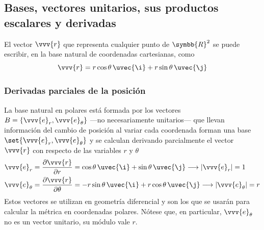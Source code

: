 \subsection{Bases, vectores unitarios, sus productos escalares y derivadas}
El vector $\vvv{r}$ que representa cualquier punto de $\symbb{R}^2$ se puede escribir, en
la base natural de coordenadas cartesianas, como
\begin{equation}
  \vvv{r} = r\cos\theta\,\uvec{\i} + r\sin\theta\,\uvec{\j}
\end{equation}
\subsubsection{Derivadas parciales de la posición}
La base natural en polares está formada por los vectores
$B = \{\vvv{e}_r, \vvv{e}_{\theta}\}$ ---no necesariamente unitarios--- que llevan
información del cambio de posición al variar cada coordenada forman una base
$\set{\vvv{e}_r, \vvv{e}_\theta}$ y se calculan derivando parcialmente el vector
$\vvv{r}$ con respecto de las variables $r$ y $\theta$
\begin{subequations}
\begin{align}
  \vvv{e}_r
  &=
    \dfrac{\partial\vvv{r}}{\partial r}
    = \cos\theta\,\uvec{\i} + \sin\theta\,\uvec{\j}
    \longrightarrow
    |\vvv{e}_r| = 1\\
  \vvv{e}_\theta
  &=
    \dfrac{\partial\vvv{r}}{\partial\theta}
    = -r\sin\theta\,\uvec{\i} + r\cos\theta\,\uvec{\j}
    \longrightarrow
    |\vvv{e}_\theta| = r\\    
\end{align}
\end{subequations}
Estos vectores se utilizan en geometría diferencial y son los que se usarán para
calcular la métrica en coordenadas polares. Nótese que, en particular, $\vvv{e}_\theta$ no es un vector unitario, su módulo vale $r$.

